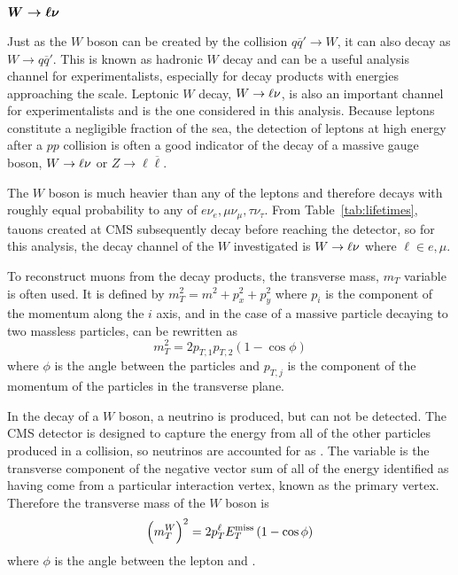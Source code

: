  \subsection[\wln]
 {$\boldsymbol{W\rightarrow\ell\nu}$}
  Just as the $W$ boson can be created by the
   collision $q\overline{q}'\rightarrow W$, 
   it can also decay as $W\rightarrow q\overline{q}'$.
  This is known as hadronic $W$ decay and
   can be a useful analysis channel for experimentalists,
   especially for decay products with energies approaching
   the \TeV scale.
  Leptonic $W$ decay, $W\rightarrow\ell\nu$, is also an important 
   channel for experimentalists and is the
   one considered in this analysis.
  Because leptons constitute a negligible fraction
   of the sea, the detection of leptons at high
   energy after a $pp$ collision is often a good 
   indicator of the decay of a massive gauge boson,
   $W\rightarrow\ell\nu$ or $Z\rightarrow \ell\overline{\ell}$.
  
  The $W$ boson is much heavier than any of the leptons
   and therefore decays with roughly equal probability
   to any of $e\nu_e, \mu\nu_\mu, \tau\nu_\tau$.
  From Table~\ref{tab:lifetimes}, tauons created
   at CMS
   subsequently decay before reaching the 
   detector, so for this analysis, the decay
   channel of the $W$ investigated is
   $W\rightarrow\ell\nu$ where $\ell\in e,\mu$.

 To reconstruct muons from the decay products,
  the transverse mass, $m_T$ variable is
  often used. 
 It is defined by
 $m_T^2 = m^2 + p_x^2 + p_y^2$
  where $p_i$ is the component of the momentum
  along the $i$ axis, and in the case of 
  a massive particle decaying to two massless
  particles, can be rewritten as
\begin{equation}
 m_T^2=2p_{T,1}p_{T,2}\left(1-\cos\phi\right)
\end{equation}
  where $\phi$ is the angle between the particles
  and $p_{T,j}$ is the component of the
  momentum of the particles in the transverse plane.

 In the decay of a $W$ boson, a neutrino 
  is produced, but can not be detected.
 The CMS detector is designed to
  capture the energy from all of the other 
  particles produced in a collision,
  so neutrinos are accounted for as \met.
 The variable \met is the
  transverse component of the negative
  vector sum of all of the 
  energy identified as having come from a particular
  interaction vertex,
  known as the primary vertex.
 Therefore the transverse mass of the $W$
  boson is 
\begin{equation}
 \left(m_T^W\right)^2=2p_{T}^\ell E_T^{\mathrm{miss}}\left(1-\cos\phi\right)
\end{equation}
  where $\phi$ is the angle between the lepton
  and \met.


